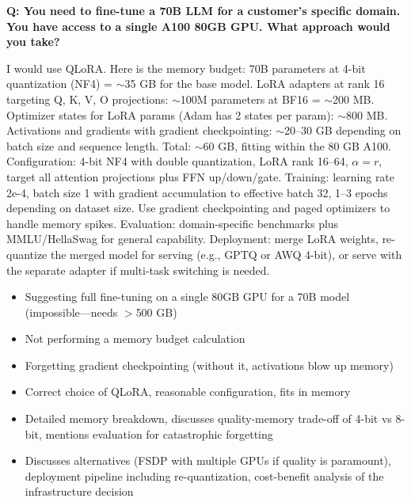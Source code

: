\begin{interviewq}
\textbf{Q: You need to fine-tune a 70B LLM for a customer's specific domain. You have access to a single A100 80GB GPU. What approach would you take?}

 \quad {} \quad \badgefreq{\freqhigh}

\stronganswer I would use QLoRA. Here is the memory budget: 70B parameters at 4-bit quantization (NF4) = $\sim$35 GB for the base model. LoRA adapters at rank 16 targeting Q, K, V, O projections: $\sim$100M parameters at BF16 = $\sim$200 MB. Optimizer states for LoRA params (Adam has 2 states per param): $\sim$800 MB. Activations and gradients with gradient checkpointing: $\sim$20--30 GB depending on batch size and sequence length. Total: $\sim$60 GB, fitting within the 80 GB A100. Configuration: 4-bit NF4 with double quantization, LoRA rank 16--64, $\alpha = r$, target all attention projections plus FFN up/down/gate. Training: learning rate 2e-4, batch size 1 with gradient accumulation to effective batch 32, 1--3 epochs depending on dataset size. Use gradient checkpointing and paged optimizers to handle memory spikes. Evaluation: domain-specific benchmarks plus MMLU/HellaSwag for general capability. Deployment: merge LoRA weights, re-quantize the merged model for serving (e.g., GPTQ or AWQ 4-bit), or serve with the separate adapter if multi-task switching is needed.

\redflags
\begin{itemize}
    \item Suggesting full fine-tuning on a single 80GB GPU for a 70B model (impossible---needs $>$500 GB)
    \item Not performing a memory budget calculation
    \item Forgetting gradient checkpointing (without it, activations blow up memory)
\end{itemize}


\goodgreat
\begin{itemize}
    \item {} Correct choice of QLoRA, reasonable configuration, fits in memory
    \item {} Detailed memory breakdown, discusses quality-memory trade-off of 4-bit vs 8-bit, mentions evaluation for catastrophic forgetting
    \item {} Discusses alternatives (FSDP with multiple GPUs if quality is paramount), deployment pipeline including re-quantization, cost-benefit analysis of the infrastructure decision
\end{itemize}

\end{interviewq}

